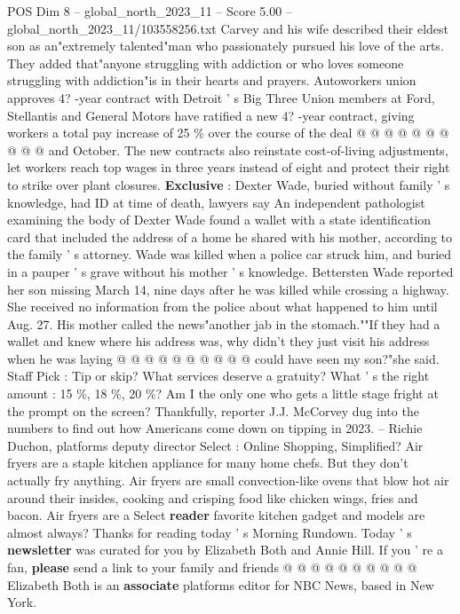 \begin{textsample}{POS Dim 8 – global\_north\_2023\_11 – Score 5.00 – global\_north\_2023\_11/103558256.txt}
Carvey and his wife described their eldest son as an"extremely talented"man who passionately pursued his love of the arts.
They added that"anyone struggling with addiction or who loves someone struggling with addiction"is in their hearts and prayers.
Autoworkers union approves 4? -year contract with Detroit ' s Big Three Union members at Ford, Stellantis and General Motors have ratified a new 4? -year contract, giving workers a total pay increase of 25 \% over the course of the deal @ @ @ @ @ @ @ @ @ @ and October.
The new contracts also reinstate cost-of-living adjustments, let workers reach top wages in three years instead of eight and protect their right to strike over plant closures. \textbf{Exclusive} : Dexter Wade, buried without family ' s knowledge, had ID at time of death, lawyers say An independent pathologist examining the body of Dexter Wade found a wallet with a state identification card that included the address of a home he shared with his mother, according to the family ' s attorney.
Wade was killed when a police car struck him, and buried in a pauper ' s grave without his mother ' s knowledge.
Bettersten Wade reported her son missing March 14, nine days after he was killed while crossing a highway.
She received no information from the police about what happened to him until Aug. 27.
His mother called the news"another jab in the stomach.""If they had a wallet and knew where his address was, why didn't they just visit his address when he was laying @ @ @ @ @ @ @ @ @ @ could have seen my son?"she said.
Staff Pick : Tip or skip?
What services deserve a gratuity?
What ' s the right amount : 15 \%, 18 \%, 20 \%?
Am I the only one who gets a little stage fright at the prompt on the screen?
Thankfully, reporter J.J.
McCorvey dug into the numbers to find out how Americans come down on tipping in 2023. -- Richie Duchon, platforms deputy director Select : Online Shopping, Simplified?
Air fryers are a staple kitchen appliance for many home chefs.
But they don't actually fry anything.
Air fryers are small convection-like ovens that blow hot air around their insides, cooking and crisping food like chicken wings, fries and bacon.
Air fryers are a Select \textbf{reader} favorite kitchen gadget and models are almost always?
Thanks for reading today ' s Morning Rundown.
Today ' s \textbf{newsletter} was curated for you by Elizabeth Both and Annie Hill.
If you ' re a fan, \textbf{please} send a link to your family and friends @ @ @ @ @ @ @ @ @ @ Elizabeth Both is an \textbf{associate} platforms editor for NBC News, based in New York.

\end{textsample}
